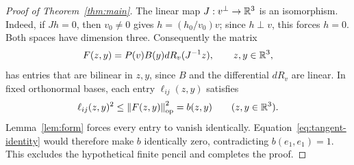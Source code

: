 \begin{proof}[Proof of Theorem~\ref{thm:main}]


The linear map \(J:v^\perp\to\mathbb R^3\) is an isomorphism. Indeed, if
\(Jh=0\), then \(v_0\ne0\) gives
\(h=(h_0/v_0)v\); since \(h\perp v\), this forces \(h=0\).
Both spaces have dimension three.
Consequently the matrix
\[
 F(z,y)=P(v)B(y)dR_v(J^{-1}z),\qquad z,y\in\mathbb R^3,
\]
has entries that are bilinear in \(z,y\), since \(B\) and the differential
\(dR_v\) are linear. In fixed orthonormal bases,
each entry \(\ell_{ij}(z,y)\) satisfies
\[
 \ell_{ij}(z,y)^2
 \le \left\lVert F(z,y)\right\rVert_{\mathrm{op}}^{2}
 =b(z,y)
 \qquad(z,y\in\mathbb R^3).
\]
Lemma~\ref{lem:form} forces every entry to vanish identically.
Equation~\eqref{eq:tangent-identity} would therefore make \(b\)
identically zero, contradicting \(b(e_1,e_1)=1\).
This excludes the hypothetical finite pencil and completes the proof.
\end{proof}
